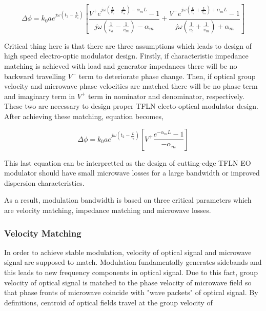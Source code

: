 \documentclass[thesis]{deutez}
\begin{document}
    \begin{equation}
        \Delta \phi= k_0 a e^{j\omega \left(t_2 - \frac{L}{v_o}\right)} \left[ \frac{V^+ e^{j\omega \left(\frac{L}{v_o} - \frac{L}{v_m}\right) - \alpha_m L} - 1}{j\omega \left(\frac{1}{v_o} - \frac{1}{v_m}\right) - \alpha_m}+\frac{V^- e^{j\omega \left(\frac{L}{v_o} + \frac{L}{v_m}\right) + \alpha_m L} - 1}{j\omega \left(\frac{1}{v_o} + \frac{1}{v_m}\right) + \alpha_m}\right]
    \end{equation}
    
	Critical thing here is that there are three assumptions which leads to design of high speed electro-optic modulator design. Firstly, if characteristic impedance matching is achieved with load and generator impedances there will be no backward travelling $V^-$ term to deteriorate phase change. Then, if optical group velocity and microwave phase velocities are matched there will be no phase term and imaginary term in $V^+$ term in nominator and denominator, respectively. These two are necessary to design proper TFLN electo-optical modulator design. After achieving these matching, equation becomes,

    \begin{equation}
        \Delta \phi = k_0 a e^{j\omega \left(t_2 - \frac{L}{v_o}\right)}\left[ V^+ \frac{e^{- \alpha_m L}-1}{- \alpha_m}  \right]
        \label{eq:phase_change_microwave_loss_dependent_term}
    \end{equation}

    This last equation can be interpretted as the design of cutting-edge TFLN EO modulator should have small microwave losses for a large bandwidth or improved dispersion characteristics.    
    
    As a result, modulation bandwidth is based on three critical parameters which are velocity matching, impedance matching and microwave losses.
    
    \subsubsection{Velocity Matching}
    In order to achieve stable modulation, velocity of optical signal and microwave signal are supposed to match. Modulation fundamentally generates sidebands and this leads to new frequency components in optical signal. Due to this fact, group velocity of optical signal is matched to the phase velocity of microwave field so that phase fronts of microwave coincide with "wave packets" of optical signal. By definitions, centroid of optical fields travel at the group velocity of 
\end{document}
